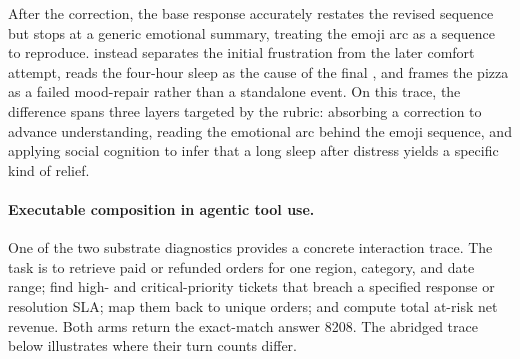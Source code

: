 After the correction, the base response accurately restates the revised sequence but stops at a generic emotional summary, treating the emoji arc as a sequence to reproduce. \venti{} instead separates the initial frustration from the later comfort attempt, reads the four-hour sleep as the cause of the final , and frames the pizza as a failed mood-repair rather than a standalone event. On this trace, the difference spans three layers targeted by the rubric: absorbing a correction to advance understanding, reading the emotional arc behind the emoji sequence, and applying social cognition to infer that a long sleep after distress yields a specific kind of relief.

\paragraph{Executable composition in agentic tool use.}
One of the two substrate diagnostics provides a concrete interaction trace. The task is to retrieve paid or refunded orders for one region, category, and date range; find high- and critical-priority tickets that breach a specified response or resolution SLA; map them back to unique orders; and compute total at-risk net revenue. Both arms return the exact-match answer 8208. The abridged trace below illustrates where their turn counts differ.

